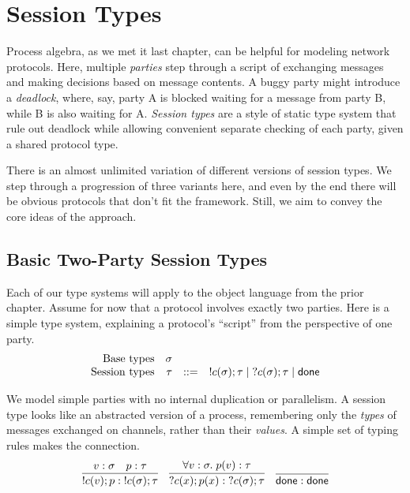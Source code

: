 \documentclass{amsbook}
\theoremstyle{definition}
\theoremstyle{remark}
\numberwithin{section}{chapter}
\numberwithin{equation}{chapter}
\begin{document}

\newcommand{\compl}[1]{\overline{#1}}
\newcommand{\channels}[0]{\mathcal C}
\newcommand{\mpty}[4]{#1 :_{#2,#3} #4}
\newcommand{\mptys}[3]{#1 :_{#2} #3}

\chapter{Session Types}

Process algebra, as we met it last chapter, can be helpful for modeling network protocols.
Here, multiple \emph{parties} step through a script of exchanging messages and making decisions based on message contents.
A buggy party might introduce a \emph{deadlock}, where, say, party A is blocked waiting for a message from party B, while B is also waiting for A.
\emph{Session types} are a style of static type system that rule out deadlock while allowing convenient separate checking of each party, given a shared protocol type.

There is an almost unlimited variation of different versions of session types.
We step through a progression of three variants here, and even by the end there will be obvious protocols that don't fit the framework.
Still, we aim to convey the core ideas of the approach.

\section{Basic Two-Party Session Types}

Each of our type systems will apply to the object language from the prior chapter.
Assume for now that a protocol involves exactly two parties.
Here is a simple type system, explaining a protocol's ``script'' from the perspective of one party.
$$\begin{array}{rrcl}
  \textrm{Base types} & \sigma \\
  \textrm{Session types} & \tau &::=& !c(\sigma); \tau \mid \; ?c(\sigma); \tau \mid \mathsf{done}
\end{array}$$

\abstraction
We model simple parties with no internal duplication or parallelism.
A session type looks like an abstracted version of a process, remembering only the \emph{types} of messages exchanged on channels, rather than their \emph{values}.
A simple set of typing rules makes the connection.
$$\infer{\send{c}{v}{p} : \; \send{c}{\sigma}{\tau}}{
  v : \sigma
  & p : \tau
}
\quad \infer{\recv{c}{x}{p(x)} : \; \recv{c}{\sigma}{\tau}}{
  \forall v : \sigma. \; p(v) : \tau
}
\quad \infer{\done : \done}{}$$
\end{document}

